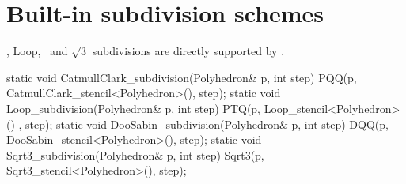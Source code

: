





\section{Built-in subdivision schemes}
\CC , Loop, \DS\ and $\sqrt{3}$ subdivisions are directly supported 
by . 

\begin{ccExampleCode}
  static void CatmullClark_subdivision(Polyhedron& p, int step) {
    PQQ(p, CatmullClark_stencil<Polyhedron>(), step);
  }
  static void Loop_subdivision(Polyhedron& p, int step) {
    PTQ(p, Loop_stencil<Polyhedron>() , step);
  }
  static void DooSabin_subdivision(Polyhedron& p, int step) {
    DQQ(p, DooSabin_stencil<Polyhedron>(), step);
  }
  static void Sqrt3_subdivision(Polyhedron& p, int step) {
    Sqrt3(p, Sqrt3_stencil<Polyhedron>(), step);
  }
\end{ccExampleCode}

